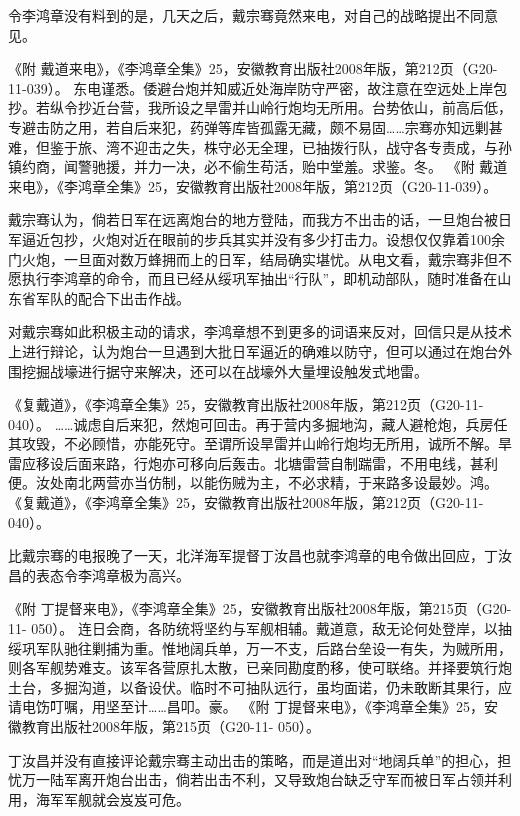 \documentclass[12pt,UTF8]{ctexbook}
\begin{document}
令李鸿章没有料到的是，几天之后，戴宗骞竟然来电，对自己的战略提出不同意见。

《附 戴道来电》，《李鸿章全集》25，安徽教育出版社2008年版，第212页（G20-11-039）。
东电谨悉。倭避台炮并知威近处海岸防守严密，故注意在空远处上岸包抄。若纵令抄近台营，我所设之旱雷并山岭行炮均无所用。台势依山，前高后低，专避击防之用，若自后来犯，药弹等库皆孤露无藏，颇不易固……宗骞亦知远剿甚难，但鉴于旅、湾不迎击之失，株守必无全理，已抽拨行队，战守各专责成，与孙镇约商，闻警驰援，并力一决，必不偷生苟活，贻中堂羞。求鉴。冬。 《附 戴道来电》，《李鸿章全集》25，安徽教育出版社2008年版，第212页（G20-11-039）。

戴宗骞认为，倘若日军在远离炮台的地方登陆，而我方不出击的话，一旦炮台被日军逼近包抄，火炮对近在眼前的步兵其实并没有多少打击力。设想仅仅靠着100余门火炮，一旦面对数万蜂拥而上的日军，结局确实堪忧。从电文看，戴宗骞非但不愿执行李鸿章的命令，而且已经从绥巩军抽出“行队”，即机动部队，随时准备在山东省军队的配合下出击作战。

对戴宗骞如此积极主动的请求，李鸿章想不到更多的词语来反对，回信只是从技术上进行辩论，认为炮台一旦遇到大批日军逼近的确难以防守，但可以通过在炮台外围挖掘战壕进行据守来解决，还可以在战壕外大量埋设触发式地雷。

《复戴道》，《李鸿章全集》25，安徽教育出版社2008年版，第212页（G20-11-040）。
……诚虑自后来犯，然炮可回击。再于营内多掘地沟，藏人避枪炮，兵房任其攻毁，不必顾惜，亦能死守。至谓所设旱雷并山岭行炮均无所用，诚所不解。旱雷应移设后面来路，行炮亦可移向后轰击。北塘雷营自制踹雷，不用电线，甚利便。汝处南北两营亦当仿制，以能伤贼为主，不必求精，于来路多设最妙。鸿。 《复戴道》，《李鸿章全集》25，安徽教育出版社2008年版，第212页（G20-11-040）。

比戴宗骞的电报晚了一天，北洋海军提督丁汝昌也就李鸿章的电令做出回应，丁汝昌的表态令李鸿章极为高兴。

《附 丁提督来电》，《李鸿章全集》25，安徽教育出版社2008年版，第215页（G20-11- 050）。
连日会商，各防统将坚约与军舰相辅。戴道意，敌无论何处登岸，以抽绥巩军队驰往剿捕为重。惟地阔兵单，万一不支，后路台垒设一有失，为贼所用，则各军舰势难支。该军各营原扎太散，已亲同勘度酌移，使可联络。并择要筑行炮土台，多掘沟道，以备设伏。临时不可抽队远行，虽均面诺，仍未敢断其果行，应请电饬叮嘱，用坚至计……昌叩。豪。 《附 丁提督来电》，《李鸿章全集》25，安徽教育出版社2008年版，第215页（G20-11- 050）。

丁汝昌并没有直接评论戴宗骞主动出击的策略，而是道出对“地阔兵单”的担心，担忧万一陆军离开炮台出击，倘若出击不利，又导致炮台缺乏守军而被日军占领并利用，海军军舰就会岌岌可危。
\end{document}
